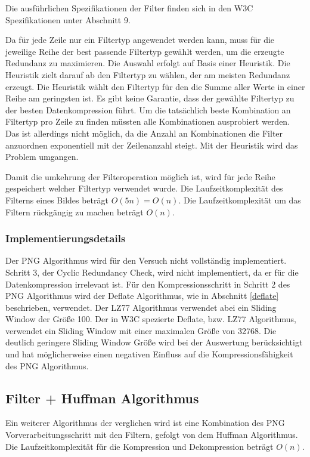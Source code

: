 \documentclass[conference]{IEEEtran}
\begin{document}
Die ausführlichen Spezifikationen der Filter finden sich in den W3C Spezifikationen \cite{w3c} unter
Abschnitt 9.

Da für jede Zeile nur ein Filtertyp angewendet werden kann, muss für die jeweilige
Reihe der best passende Filtertyp gewählt werden, um die erzeugte Redundanz zu maximieren.
Die Auswahl erfolgt auf Basis einer Heuristik.
Die Heuristik zielt darauf ab den Filtertyp zu wählen, der am meisten Redundanz erzeugt.
Die Heuristik wählt den Filtertyp für den die Summe aller Werte in einer Reihe
am geringsten ist.
Es gibt keine Garantie, dass der gewählte Filtertyp zu der besten Datenkompression
führt.
Um die tatsächlich beste Kombination an Filtertyp pro Zeile zu finden müssten alle
Kombinationen ausprobiert werden.
Das ist allerdings nicht möglich, da die Anzahl an Kombinationen die Filter
anzuordnen exponentiell mit der Zeilenanzahl steigt.
Mit der Heuristik wird das Problem umgangen.

Damit die umkehrung der Filteroperation möglich ist, wird für jede Reihe gespeichert welcher
Filtertyp verwendet wurde.
Die Laufzeitkomplexität des Filterns eines Bildes beträgt $O(5n) = O(n)$.
Die Laufzeitkomplexität um das Filtern rückgängig zu machen beträgt $O(n)$.
\cite{nick}


\subsubsection{Implementierungsdetails}

Der PNG Algorithmus wird für den Versuch nicht vollständig implementiert.
Schritt 3, der Cyclic Redundancy Check, wird nicht implementiert, da
er für die Datenkompression irrelevant ist.
Für den Kompressionsschritt in Schritt 2 des PNG Algorithmus wird der Deflate
Algorithmus, wie in Abschnitt \ref{deflate} beschrieben, verwendet.
Der LZ77 Algorithmus verwendet abei ein Sliding Window der Größe 100.
Der in W3C spezierte Deflate, bzw. LZ77 Algorithmus, verwendet ein Sliding Window
mit einer maximalen Größe von 32768. \cite{w3c}
Die deutlich geringere Sliding Window Größe wird bei der Auswertung berücksichtigt
und hat möglicherweise einen negativen Einfluss auf die Kompressionsfähigkeit
des PNG Algorithmus.

\subsection{Filter + Huffman Algorithmus}

Ein weiterer Algorithmus der verglichen wird ist eine Kombination des PNG
Vorverarbeitungsschritt mit den Filtern, gefolgt von dem Huffman Algorithmus.
Die Laufzeitkomplexität für die Kompression und Dekompression beträgt
$O(n)$.
\end{document}
